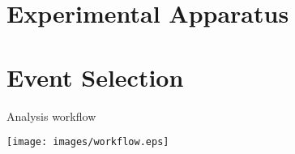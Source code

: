 \documentclass{beamer}
\begin{document}



















\section[Experimental Apparatus]{Experimental Apparatus}


\section[Event Selection]{Event Selection}

\begin{frame}{Analysis workflow}
  \begin{center}
  \texttt{[image: images/workflow.eps]}
  \end{center}
\end{frame}
\end{document}
